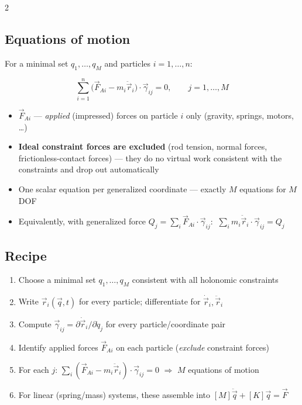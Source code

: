 \documentclass[10pt]{article}
\begin{document}
\begin{multicols}{2}
\subsection*{Equations of motion}
For a minimal set $q_1,\dots,q_M$ and particles $i=1,\dots,n$:
\begin{keybox}
\[
    \sum_{i=1}^{n}\big(\vec F_{Ai}-m_i\ddot{\vec r}_i\big)\cdot\vec\gamma_{ij}=0, \qquad j=1,\dots,M
\]
\end{keybox}
\begin{itemize}[nosep, leftmargin=1.1em]
    \item $\vec F_{Ai}$ --- \emph{applied} (impressed) forces on particle $i$ only (gravity, springs, motors, \dots)
    \item \textbf{Ideal constraint forces are excluded} (rod tension, normal forces, frictionless-contact forces) --- they do no virtual work consistent with the constraints and drop out automatically
    \item One scalar equation per generalized coordinate --- exactly $M$ equations for $M$ DOF
    \item Equivalently, with generalized force $Q_j=\sum_i\vec F_{Ai}\cdot\vec\gamma_{ij}$: $\ \sum_i m_i\ddot{\vec r}_i\cdot\vec\gamma_{ij}=Q_j$
\end{itemize}

\subsection*{Recipe}
\begin{enumerate}[nosep, leftmargin=1.3em]
    \item Choose a minimal set $q_1,\dots,q_M$ consistent with all holonomic constraints
    \item Write $\vec r_i(\vec q,t)$ for every particle; differentiate for $\dot{\vec r}_i,\ddot{\vec r}_i$
    \item Compute $\vec\gamma_{ij}=\partial\dot{\vec r}_i/\partial\dot q_j$ for every particle/coordinate pair
    \item Identify applied forces $\vec F_{Ai}$ on each particle (\emph{exclude} constraint forces)
    \item For each $j$: $\sum_i(\vec F_{Ai}-m_i\ddot{\vec r}_i)\cdot\vec\gamma_{ij}=0$ $\Rightarrow$ $M$ equations of motion
    \item For linear (spring/mass) systems, these assemble into $[M]\ddot{\vec q}+[K]\vec q=\vec F$
\end{enumerate}


\end{multicols}
\end{document}
